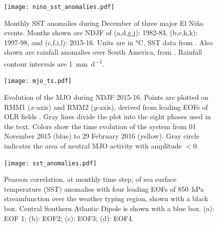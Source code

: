 \documentclass{article}
\begin{document}
\begin{figure}
	\texttt{[image: nino\_sst\_anomalies.pdf]}
	\caption{
		Monthly SST anomalies during December of three major El Ni\~{n}o events.
		Months shown are NDJF of (a,d,g,j): 1982-83, (b,e,h,k): 1997-98, and (c,f,i,l): 2015-16.
		Units are in \si{\celsius}.
		SST data from \citet{Reynolds2002}.
		Also shown are rainfall anomalies over South America, from \citet{Chen2008}.
		Rainfall contour intervals are \SI{1}{\milli\meter\per\day}.
	}
\end{figure}

\begin{figure}
	\texttt{[image: mjo\_ts.pdf]}
	\caption{
		Evolution of the MJO during NDJF 2015-16.
		Points are plotted on RMM1 ($x$-axis) and RMM2 ($y$-axis), derived from leading EOFs of OLR fields \citep{Wheeler2004}.
		Gray lines divide the plot into the eight phases used in the text.
		Colors show the time evolution of the system from 01 November 2015 (blue) to 29 February 2016 (yellow).
		Gray circle indicates the area of neutral MJO activity with amplitude $<0$.
	}
\end{figure}

\begin{figure}
	\noindent\texttt{[image: sst\_anomalies.pdf]}
	\caption{
		Pearson correlation, at monthly time step, of  sea surface temperature (SST) anomalies \citep{Reynolds2002} with four leading EOFs of \SI{850}{\hecto\pascal} streamfunction over the weather typing region, shown with a black box.
		Central Southern Atlantic Dipole is shown with a blue box.
		(a): EOF 1; (b): EOF2; (c): EOF3; (d): EOF4.
	}\label{fig:sst-anomalies}
\end{figure}

\clearpage


\end{document}
